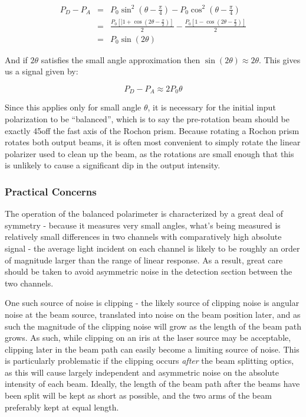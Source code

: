 \documentclass[PaulGanssle-Thesis.tex]{subfiles}
\begin{document}
\begin{eqnarray}
P_{D} - P_{A} & = & P_{0}\sin^2(\theta - \frac{\pi}{4}) - P_{0}\cos^2(\theta - \frac{\pi}{4}) \\
& = & \frac{P_{0}\left[]1+\cos\left(2\theta - \frac{\pi}{2}\right)\right]}{2} - \frac{P_{0}\left[1-\cos\left(2\theta - \frac{\pi}{2}\right)\right]}{2} \\
& = & P_{0}\sin\left(2\theta\right)
\end{eqnarray}

And if $2\theta$ satisfies the small angle approximation then $\sin(2\theta) \approx 2\theta$. This gives us a signal given by:

\begin{equation}
P_{D} - P_{A} \approx 2P_{0}\theta
\end{equation}

Since this applies only for small angle $\theta$, it is necessary for the initial input polarization to be ``balanced'', which is to say the pre-rotation beam should be exactly 45\degsym  off the fast axis of the Rochon prism. Because rotating a Rochon prism rotates both output beams, it is often most convenient to simply rotate the linear polarizer used to clean up the beam, as the rotations are small enough that this is unlikely to cause a significant dip in the output intensity.

\subsubsection{Practical Concerns}
\label{mag.design.balanced.polarimeter.practical}
The operation of the balanced polarimeter is characterized by a great deal of symmetry - because it measures very small angles, what's being measured is relatively small differences in two channels with comparatively high absolute signal - the average light incident on each channel is likely to be roughly an order of magnitude larger than the range of linear response. As a result, great care should be taken to avoid asymmetric noise in the detection section between the two channels. 

One such source of noise is clipping - the likely source of clipping noise is angular noise at the beam source, translated into noise on the beam position later, and as such the magnitude of the clipping noise will grow as the length of the beam path grows. As such, while clipping on an iris at the laser source may be acceptable, clipping later in the beam path can easily become a limiting source of noise. This is particularly problematic if the clipping occurs \textit{after} the beam splitting optics, as this will cause largely independent and asymmetric noise on the absolute intensity of each beam. Ideally, the length of the beam path after the beams have been split will be kept as short as possible, and the two arms of the beam preferably kept at equal length.
\end{document}
